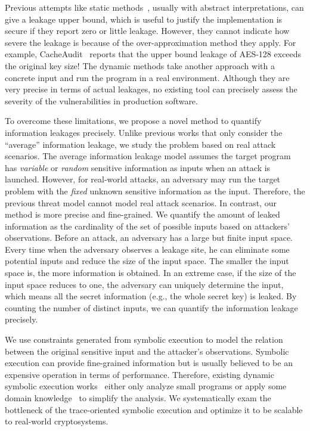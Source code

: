 Previous attempts like static methods~\cite{182946,5207642}, usually with
abstract interpretations, can give a leakage upper bound, which is useful to
justify the implementation is secure if they report zero or little leakage.
However, they cannot indicate how severe the leakage is because of the
over-approximation method they apply. For example, CacheAudit~\cite{182946} reports that the upper
bound leakage of AES-128 exceeds the original key size! The dynamic methods take
another approach with a concrete input and run the program in a real
environment. Although they are very precise in terms of actual leakages, no
existing tool can precisely assess the severity of the vulnerabilities in production
software. 

To overcome these limitations, we propose a novel method to quantify information
leakages precisely. Unlike previous works that only consider the
``average'' information leakage, we study the problem based on real attack
scenarios. The average information leakage model assumes the target program has
\emph{variable} or \emph{random} sensitive information as inputs when an attack is
launched. However, for real-world attacks, an adversary may run the target
problem with the \emph{fixed} unknown sensitive information
as the input. Therefore, the previous threat model cannot model real attack
scenarios. In contrast, our method is more precise and fine-grained. 
We quantify
the amount of leaked information as the cardinality of the set of possible
inputs based on attackers' observations.
Before an attack, an adversary has a large but finite input space. Every time
when the adversary observes a leakage site, he can eliminate some potential
inputs and reduce the size of the input space. The smaller the input space is,
the more information is obtained. In an extreme case, if the size of the
input space reduces to one, the adversary can uniquely determine the input, 
which means all the secret information (e.g., the whole secret key) is
leaked. By counting the number of distinct inputs, we can quantify the
information leakage precisely.

We use constraints generated from symbolic execution to model the relation 
between the original sensitive input
and the attacker's observations. Symbolic execution can
provide fine-grained information but is usually believed to be an expensive
operation in terms of performance. Therefore, existing dynamic symbolic
execution works~\cite{203878,236338,Brotzman19Casym} either only analyze
small programs or apply some domain knowledge~\cite{203878} to simplify the analysis. We
systematically exam the bottleneck of the trace-oriented symbolic execution and optimize it
to be scalable to real-world cryptosystems.

